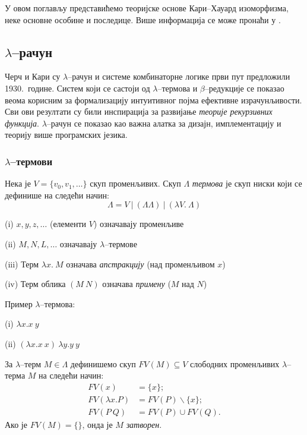 У овом поглављу представићемо теоријске основе Кари--Хауард
изоморфизма, неке основне особине и последице. Више информација се
може пронаћи у \cite{barendregt2013lambda, sorensen2006lectures}.

\subsection{$\lambda$--рачун}

Черч и Кари су $\lambda$--рачун и системе комбинаторне логике први пут
предложили 1930.~године. Систем који се састоји од $\lambda$--термова
и $\beta$--редукције се показао веома корисним за формализацију
интуитивног појма ефективне израчунљивости. Сви ови резултати су били
инспирација за развијање \emph{теорије рекурзивних
  функција}. $\lambda$--рачун се показао као важна алатка за дизајн,
имплементацију и теорију више програмских језика.

\subsubsection{$\lambda$--термови}

\begin{definition}
Нека је $V = \{v_0, v_1, \ldots \}$ скуп променљивих. Скуп $\Lambda$
\emph{термова} је скуп ниски који се дефинише на следећи начин:
$$\Lambda = V\ |\ (\Lambda \Lambda)\ |\ (\lambda V.\ \Lambda)$$
\end{definition}

\begin{description}
\item{(i)} $x, y, z, \ldots$ (елементи $V$) означавају променљиве
\item{(ii)} $M, N, L, \ldots$ означавају $\lambda$--термове
\item{(iii)} Терм $\lambda x.\ M$ означава \emph{апстракцију} (над променљивом $x$)
\item{(iv)} Терм облика $(M\ N)$ означава \emph{примену} ($M$ над $N$)
\end{description}

\begin{primer} Пример $\lambda$--термова:
\begin{description}
\item{(i)} $\lambda x. x\ y$ 
\item{(ii)} $(\lambda x. x\ x)\ \lambda y. y\ y$
\end{description}
\end{primer}

\begin{definition}
За $\lambda$--терм $M \in \Lambda$ дефинишемо скуп $FV(M) \subseteq V$
слободних променљивих $\lambda$--терма $M$ на следећи начин:
\begin{align*}
FV(x) &= \{x\}; \\
FV(\lambda x. P) &= FV(P)\backslash\{x\}; \\
FV(P\ Q) &= FV(P) \cup FV(Q).
\end{align*}
Ако је $FV(M) = \{ \}$, онда је $M$ \emph{затворен}.
\end{definition}


